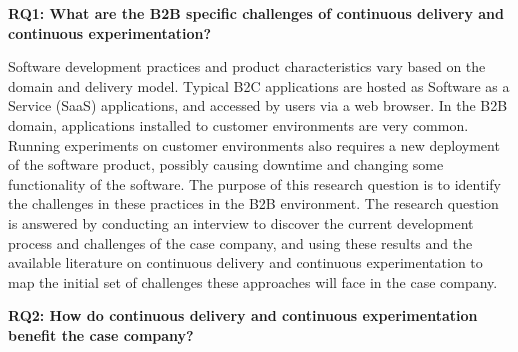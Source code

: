 \documentclass[english]{tktltiki2}
\theoremstyle{definition}
\theoremstyle{remark}
\begin{document}
\noindent \textbf{RQ1: What are the B2B specific challenges of continuous delivery and continuous experimentation?}

\noindent Software development practices and product characteristics vary based on the domain and delivery model. Typical B2C applications are hosted as Software as a Service (SaaS) applications, and accessed by users via a web browser. In the B2B domain, applications installed to customer environments are very common. Running experiments on customer environments also requires a new deployment of the software product, possibly causing downtime and changing some functionality of the software. The purpose of this research question is to identify the challenges in these practices in the B2B environment. The research question is answered by conducting an interview to discover the current development process and challenges of the case company, and using these results and the available literature on continuous delivery and continuous experimentation to map the initial set of challenges these approaches will face in the case company.
\newline




\noindent \textbf{RQ2: How do continuous delivery and continuous experimentation benefit the case company?} %
\end{document}
